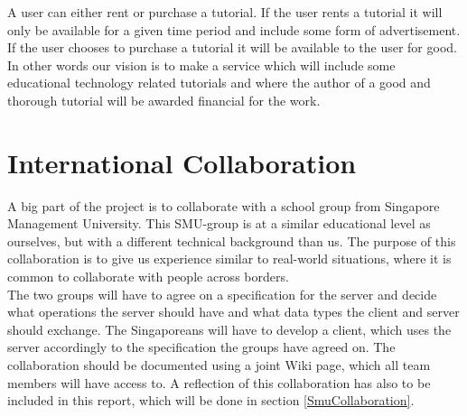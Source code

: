 A user can either rent or purchase a tutorial. If the user rents a tutorial it will only be available for a given time period and include some form of advertisement. If the user chooses to purchase a tutorial it will be available to the user for good. \\ 
In other words our vision is to make a service which will include some educational technology related tutorials and  where the author of a good and thorough tutorial will be awarded financial for the work.

\section{International Collaboration} \label{InternationCollaboration}
A big part of the project is to collaborate with a school group from Singapore Management University. This SMU-group is at a similar educational level as ourselves, but with a different technical background than us. The purpose of this collaboration is to give us experience similar to real-world situations, where it is common to collaborate with people across borders.\\
The two groups will have to agree on a specification for the server and decide what operations the server should have and what data types the client and server should exchange.
The Singaporeans will have to develop a client, which uses the server accordingly to the specification the groups have agreed on. The collaboration should be documented using a joint Wiki page, which all team members will have access to. A reflection of this collaboration has also to be included in this report, which will be done in section \ref{SmuCollaboration}.

